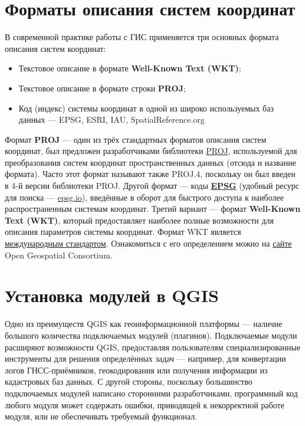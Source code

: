 \documentclass[
  12pt,
]{book}
\providecommand{\tightlist}{%
  \setlength{\itemsep}{0pt}\setlength{\parskip}{0pt}}
\begin{document}
\hypertarget{manual-crs}{%
\chapter{Форматы описания систем координат}\label{manual-crs}}

В современной практике работы с ГИС применяется три основных формата описания систем координат:

\begin{itemize}
\tightlist
\item
  Текстовое описание в формате \textbf{Well-Known Text (WKT)};
\item
  Текстовое описание в формате строки \textbf{PROJ};
\item
  Код (индекс) системы координат в одной из широко используемых баз данных --- EPSG, ESRI, IAU, SpatialReference.org
\end{itemize}

Формат \textbf{PROJ} --- один из трёх стандартных форматов описания систем координат, был предложен разработчиками библиотеки \href{https://proj.org/}{PROJ}, используемой для преобразования систем координат пространственных данных (отсюда и название формата). Часто этот формат называют также PROJ.4, поскольку он был введен в 4-й версии библиотеки PROJ. Другой формат --- коды \href{http://www.epsg-registry.org/}{\textbf{EPSG}} (удобный ресурс для поиска --- \href{https://epsg.io/}{epsg.io}), введённые в оборот для быстрого доступа к наиболее распространенным системам координат. Третий вариант --- формат \textbf{Well-Known Text (WKT)}, который предоставляет наиболее полные возможности для описания параметров системы координат. Формат WKT является \href{https://www.iso.org/standard/76496.html}{международным стандартом}. Ознакомиться с его определением можно на \href{http://docs.opengeospatial.org/is/18-010r7/18-010r7.html}{сайте} Open Geospatial Consortium.

\hypertarget{manual-plugins}{%
\chapter{Установка модулей в QGIS}\label{manual-plugins}}

Одно из преимуществ QGIS как геоинформационной платформы --- наличие большого количества подключаемых модулей (плагинов). Подключаемые модули расширяют возможности QGIS, предоставляя пользователям специализированные инструменты для решения определённых задач --- например, для конвертации логов ГНСС-приёмников, геокодирования или получения информации из кадастровых баз данных. С другой стороны, поскольку большинство подключаемых модулей написано сторонними разработчиками, программный код любого модуля может содержать ошибки, приводящей к некорректной работе модуля, или не обеспечивать требуемый функционал.
\end{document}
